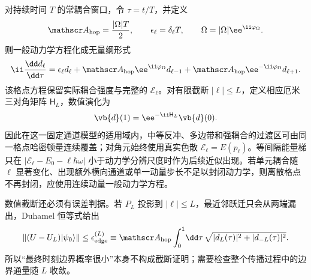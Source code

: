 对持续时间 $T$ 的常耦合窗口，令 $\tau=t/T$，并定义
\begin{equation*}
\mathscr A_{\rm hop}=\frac{|\Omega|T}{2},
\qquad
\epsilon_\ell=\delta_\ell T,
\qquad
\Omega=|\Omega|\ee^{\ii\varphi_\Omega}.
\end{equation*}
则一般动力学方程化成无量纲形式
\begin{equation}
{
\ii\frac{\dd d_\ell}{\dd\tau}
=\epsilon_\ell d_\ell
+\mathscr A_{\rm hop}\ee^{\ii\varphi_\Omega}d_{\ell-1}
+\mathscr A_{\rm hop}\ee^{-\ii\varphi_\Omega}d_{\ell+1}.}
\label{eq:recoil_dimensionless_exact_lattice}
\end{equation}
该格点方程保留实际耦合强度与完整的 $\mathcal E_\ell$。对有限截断 $|\ell|\le L$，定义相应厄米三对角矩阵 $\mathsf H_L$，数值演化为
\begin{equation}
{\vb{d}(1)=\ee^{-\ii\mathsf H_L}\vb{d}(0).}
\label{eq:recoil_finite_lattice_matrix_exponential}
\end{equation}
因此在这一固定通道模型的适用域内，中等反冲、多边带和强耦合的过渡区可由同一格点哈密顿量连续覆盖；对角元始终使用真实色散 $\mathcal E_\ell=E(p_\ell)$。等间隔能量梯只在 $|\mathcal E_\ell-E_0-\ell\hbar\omega|$ 小于动力学分辨尺度时作为后续近似出现。若单元耦合随 $\ell$ 显著变化、出现额外横向通道或单一动量步长不足以封闭动力学，则离散格点不再封闭，应使用连续动量一般动力学方程。

数值截断还必须有误差判据。若 $P_L$ 投影到 $|\ell|\le L$，最近邻跃迁只会从两端漏出，Duhamel 恒等式给出
\begin{equation}
{
\left\|(U-U_L)|\psi_0\rangle\right\|
\le
\epsilon_{\rm edge}^{(L)}
\equiv
\mathscr A_{\rm hop}\int_0^1\!\dd\tau\,
\sqrt{|d_L(\tau)|^2+|d_{-L}(\tau)|^2}.}
\label{eq:recoil_lattice_truncation_duhamel_bound}
\end{equation}
所以“最终时刻边界概率很小”本身不构成截断证明；需要检查整个传播过程中的边界通量随 $L$ 收敛。


